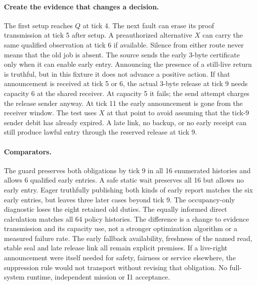 \documentclass[11pt]{article}
\begin{document}
\paragraph{Create the evidence that changes a decision.}
The first setup reaches \(Q\) at tick 4. The next fault can erase its
proof transmission at tick 5 after setup. A preauthorized alternative
\(X\) can carry the same qualified observation at tick 6 if available.
Silence from either route never means that the old job is absent.
The source sends the early 3-byte certificate only when it can enable
early entry. Announcing the presence of a still-live return is truthful,
but in this fixture it does not advance a positive action. If that
announcement is received at tick 5 or 6, the actual 3-byte release
at tick 9 needs capacity 6 at the shared receiver. At capacity 5 it
fails; the send attempt charges the release sender anyway. At tick 11
the early announcement is gone from the receiver window. The test
uses \(X\) at that point to avoid assuming that the tick-9 sender debit
has already expired. A late link, no backup, or no early receipt can
still produce lawful entry through the reserved release at tick 9.

\paragraph{Comparators.}
The guard preserves both obligations by tick 9 in all 16 enumerated
histories and allows 6 qualified early entries. A safe static wait
preserves all 16 but allows no early entry. Eager truthfully publishing
both kinds of early report matches the six early entries, but leaves
three later cases beyond tick 9. The occupancy-only diagnostic loses
the eight retained old duties. The equally informed direct calculation
matches all 64 policy histories. The difference is a change to
evidence transmission and its capacity use, not a stronger optimization
algorithm or a measured failure rate. The early fallback availability,
freshness of the named read, stable seal and late release link all
remain explicit premises. If a live-right announcement were itself
needed for safety, fairness or service elsewhere, the suppression rule
would not transport without revising that obligation. No full-system
runtime, independent mission or I1 acceptance.
\end{document}
